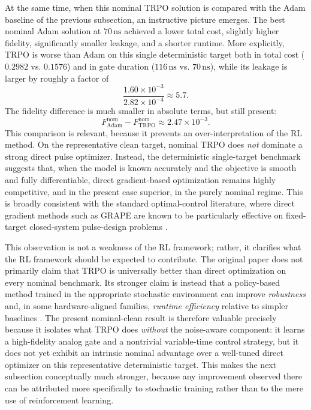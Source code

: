 At the same time, when this nominal TRPO solution is compared with the Adam baseline of the previous subsection, an instructive picture emerges. The best nominal Adam solution at \(70\,\mathrm{ns}\) achieved a lower total cost, slightly higher fidelity, significantly smaller leakage, and a shorter runtime. More explicitly, TRPO is worse than Adam on this single deterministic target both in total cost (\(0.2982\) vs. \(0.1576\)) and in gate duration (\(116\,\mathrm{ns}\) vs. \(70\,\mathrm{ns}\)), while its leakage is larger by roughly a factor of
\begin{equation}
\frac{1.60\times10^{-3}}{2.82\times10^{-4}} \approx 5.7.
\label{eq:nominal_trpo_leakage_ratio}
\end{equation}
The fidelity difference is much smaller in absolute terms, but still present:
\begin{equation}
F_{\mathrm{Adam}}^{\mathrm{nom}} - F_{\mathrm{TRPO}}^{\mathrm{nom}}
\approx 2.47\times10^{-3}.
\label{eq:nominal_fidelity_gap_adam_trpo}
\end{equation}
This comparison is relevant, because it prevents an over-interpretation of the RL method. On the representative clean target, nominal TRPO does \emph{not} dominate a strong direct pulse optimizer. Instead, the deterministic single-target benchmark suggests that, when the model is known accurately and the objective is smooth and fully differentiable, direct gradient-based optimization remains highly competitive, and in the present case superior, in the purely nominal regime. This is broadly consistent with the standard optimal-control literature, where direct gradient methods such as GRAPE are known to be particularly effective on fixed-target closed-system pulse-design problems \cite{Khaneja2005,Koch2022}.

This observation is not a weakness of the RL framework; rather, it clarifies what the RL framework should be expected to contribute. The original paper does not primarily claim that TRPO is universally better than direct optimization on every nominal benchmark. Its stronger claim is instead that a policy-based method trained in the appropriate stochastic environment can improve \emph{robustness} and, in some hardware-aligned families, \emph{runtime efficiency} relative to simpler baselines \cite{Niu2019}. The present nominal-clean result is therefore valuable precisely because it isolates what TRPO does \emph{without} the noise-aware component: it learns a high-fidelity analog gate and a nontrivial variable-time control strategy, but it does not yet exhibit an intrinsic nominal advantage over a well-tuned direct optimizer on this representative deterministic target. This makes the next subsection conceptually much stronger, because any improvement observed there can be attributed more specifically to stochastic training rather than to the mere use of reinforcement learning.

